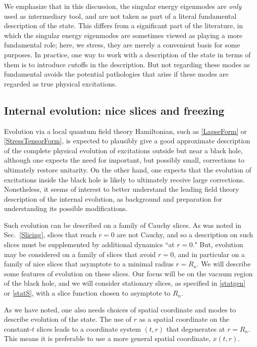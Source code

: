 \documentclass[12pt]{article}
\numberwithin{equation}{section}
\begin{document}
We emphasize that in this discussion, the singular energy eigenmodes are {\it only} used as intermediary tool, and are not taken as part of a literal fundamental description of the state.  
This differs from a significant part of the literature, in which the singular energy eigenmodes are sometimes viewed as playing a more fundamental role; here, we stress, they are merely a convenient basis for some purposes.  In practice, one way to work with a description of the state in terms of them is to introduce cutoffs in the description.  
But not  regarding these modes as fundamental  avoids the potential pathologies that arise if these modes are regarded as true physical excitations.  
 
 

\subsection{Internal evolution: nice slices and freezing}

Evolution via a local quantum field theory Hamiltonian, such as \eqref{LapseForm} or \eqref{StressTensorForm}, is expected to plausibly give a good approximate description of the complete physical evolution of excitations outside but near a black hole, although one expects the need for important, but possibly small,  corrections to ultimately restore unitarity\cite{SGmodels,BHQIUE,NVNL,NVU,BHQU}.  On the other hand, one expects that the evolution of excitations inside the black hole is likely to ultimately receive large corrections.  Nonetheless, it seems of interest to better understand the leading field theory description of the internal evolution, as background and preparation for understanding its possible modifications.

Such evolution can be described on a family of Cauchy slices.  As was noted in Sec.~\ref{Slicing}, slices that reach $r=0$ are not Cauchy, and so a description on such slices must be supplemented by additional dynamics ``at $r=0$."  But, evolution may be considered on a family of slices that avoid $r=0$, and in particular on a family of nice slices that asymptote to a minimal radius $r=R_n$.  We will describe some features of evolution on these slices.  Our focus will be on the vacuum region of the black hole, and we will consider stationary slices, as specified in \eqref{statgen} or \eqref{statS}, with a slice function chosen to asymptote to $R_n$. 

As we have noted, one also needs choices of spatial coordinate and modes to describe evolution of the state.  The use of $r$ as a spatial coordinate on the constant-$t$ slices leads to a coordinate system $(t,r)$ that degenerates at $r=R_n$.  This means it is preferable to use a more general spatial coordinate, $x(t,r)$.  
\end{document}
